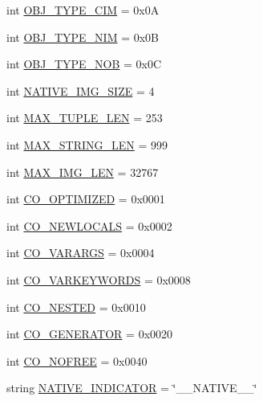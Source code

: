 \begin{DoxyCompactItemize}
\item 
int \hyperlink{namespacepm_img_creator_ad007a59b331893030a7be310c4e346f6}{O\-B\-J\-\_\-\-T\-Y\-P\-E\-\_\-\-C\-I\-M} = 0x0\-A
\item 
int \hyperlink{namespacepm_img_creator_a6d51285dfe54c2e915be868a4d64a0d3}{O\-B\-J\-\_\-\-T\-Y\-P\-E\-\_\-\-N\-I\-M} = 0x0\-B
\item 
int \hyperlink{namespacepm_img_creator_a62d2969e7126ef687503c25e14ad638a}{O\-B\-J\-\_\-\-T\-Y\-P\-E\-\_\-\-N\-O\-B} = 0x0\-C
\item 
int \hyperlink{namespacepm_img_creator_ac71a9dc2afab79cdfb2172732130121a}{N\-A\-T\-I\-V\-E\-\_\-\-I\-M\-G\-\_\-\-S\-I\-Z\-E} = 4
\item 
int \hyperlink{namespacepm_img_creator_aed732c838b0e5618e83b6d62cbcd0c0e}{M\-A\-X\-\_\-\-T\-U\-P\-L\-E\-\_\-\-L\-E\-N} = 253
\item 
int \hyperlink{namespacepm_img_creator_a11581bebd338ce4bed723cb0afddb514}{M\-A\-X\-\_\-\-S\-T\-R\-I\-N\-G\-\_\-\-L\-E\-N} = 999
\item 
int \hyperlink{namespacepm_img_creator_a18e02e76a25c5735b873101951926129}{M\-A\-X\-\_\-\-I\-M\-G\-\_\-\-L\-E\-N} = 32767
\item 
int \hyperlink{namespacepm_img_creator_a3cb1b10faf2e86f72fa24afebc408ebe}{C\-O\-\_\-\-O\-P\-T\-I\-M\-I\-Z\-E\-D} = 0x0001
\item 
int \hyperlink{namespacepm_img_creator_a9f9b9cb90243369e338d1d70ee6efe48}{C\-O\-\_\-\-N\-E\-W\-L\-O\-C\-A\-L\-S} = 0x0002
\item 
int \hyperlink{namespacepm_img_creator_a7c50412765e7161b84876069e848f9bd}{C\-O\-\_\-\-V\-A\-R\-A\-R\-G\-S} = 0x0004
\item 
int \hyperlink{namespacepm_img_creator_a927722c1d6db6fd24a202b993d577616}{C\-O\-\_\-\-V\-A\-R\-K\-E\-Y\-W\-O\-R\-D\-S} = 0x0008
\item 
int \hyperlink{namespacepm_img_creator_a24d50acc62f4b51642df05ba1ed453dd}{C\-O\-\_\-\-N\-E\-S\-T\-E\-D} = 0x0010
\item 
int \hyperlink{namespacepm_img_creator_a9a7b380d1737192967de4b641e4eaa43}{C\-O\-\_\-\-G\-E\-N\-E\-R\-A\-T\-O\-R} = 0x0020
\item 
int \hyperlink{namespacepm_img_creator_a162149265a5edb76c4943a2a1a9c1d6e}{C\-O\-\_\-\-N\-O\-F\-R\-E\-E} = 0x0040
\item 
string \hyperlink{namespacepm_img_creator_a6d5494aab870eb7e281579b2f2ca5228}{N\-A\-T\-I\-V\-E\-\_\-\-I\-N\-D\-I\-C\-A\-T\-O\-R} = \char`\"{}\-\_\-\-\_\-\-N\-A\-T\-I\-V\-E\-\_\-\-\_\-\char`\"{}

\end{DoxyCompactItemize}
